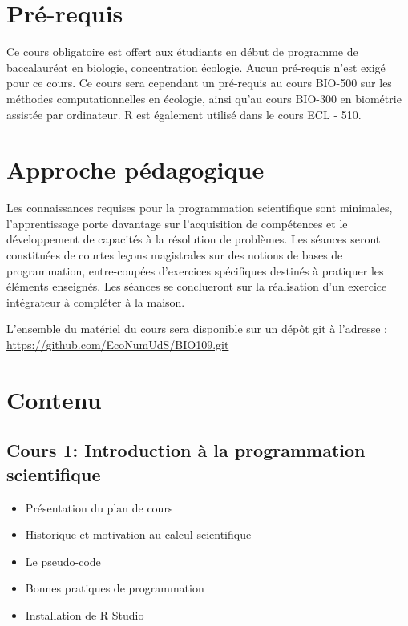 \documentclass[12]{article}
\begin{document}
	\section*{Pré-requis}

	Ce cours obligatoire est offert aux étudiants en début de programme de
	baccalauréat en biologie, concentration écologie. Aucun pré-requis n'est
	exigé pour ce cours. Ce cours sera cependant un pré-requis au cours
	BIO-500 sur les méthodes computationnelles en écologie, ainsi qu'au cours
	BIO-300 en biométrie assistée par ordinateur. R est également utilisé
	dans le cours ECL - 510.

	\section*{Approche pédagogique}

	Les connaissances requises pour la programmation scientifique sont
	minimales, l'apprentissage porte davantage sur l'acquisition de
	compétences et le développement de capacités à la résolution de problèmes.
	Les séances seront constituées de courtes leçons magistrales sur des
	notions de bases de programmation, entre-coupées d'exercices spécifiques
	destinés à pratiquer les éléments enseignés. Les séances se conclueront
	sur la réalisation d'un exercice intégrateur à compléter à la maison.

	L'ensemble du matériel du cours sera disponible sur un dépôt git à l'adresse :\\
	\url{https://github.com/EcoNumUdS/BIO109.git}

	\section*{Contenu}

	\subsection*{Cours 1: Introduction à la programmation scientifique}
	\begin{itemize}
	\renewcommand{\labelitemi}{$\bullet$}
		\item Présentation du plan de cours
		\item Historique et motivation au calcul scientifique
		\item Le pseudo-code
		\item Bonnes pratiques de programmation
		\item Installation de R Studio
	\end{itemize}
\end{document}
